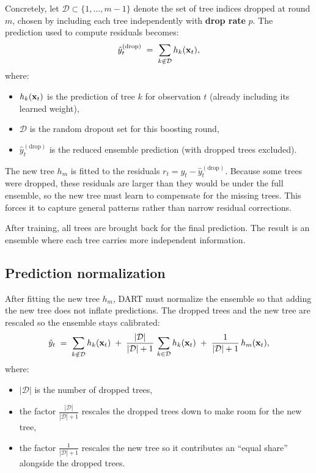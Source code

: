 Concretely, let $\mathcal{D} \subset \{1, \ldots, m-1\}$ denote the set of
tree indices dropped at round $m$, chosen by including each tree
independently with \textbf{drop rate} $p$.  The prediction used to compute
residuals becomes:
\begin{equation}\label{eq:trees:dart_pred}
  \hat{y}^{(\text{drop})}_t
  \;=\; \sum_{k \notin \mathcal{D}} h_k(\mathbf{x}_t),
\end{equation}
where:
\begin{itemize}[leftmargin=1.8em]
  \item $h_k(\mathbf{x}_t)$ is the prediction of tree $k$ for observation $t$
        (already including its learned weight),
  \item $\mathcal{D}$ is the random dropout set for this boosting round,
  \item $\hat{y}^{(\text{drop})}_t$ is the reduced ensemble prediction
        (with dropped trees excluded).
\end{itemize}

The new tree $h_m$ is fitted to the residuals
$r_t = y_t - \hat{y}^{(\text{drop})}_t$.  Because some trees were dropped,
these residuals are larger than they would be under the full ensemble, so the
new tree must learn to compensate for the missing trees.  This forces it to
capture general patterns rather than narrow residual corrections.

\begin{intuition}
After training, all trees are brought back for the final
prediction.  The result is an ensemble where each tree carries more
independent information.
\end{intuition}

\subsection*{Prediction normalization}

After fitting the new tree $h_m$, DART must normalize the ensemble so that
adding the new tree does not inflate predictions.  The dropped trees and the
new tree are rescaled so the ensemble stays calibrated:
\begin{equation}\label{eq:trees:dart_normalize}
  \hat{y}_t
  \;=\; \sum_{k \notin \mathcal{D}} h_k(\mathbf{x}_t)
  \;+\; \frac{|\mathcal{D}|}{|\mathcal{D}| + 1}\,
  \sum_{k \in \mathcal{D}} h_k(\mathbf{x}_t)
  \;+\; \frac{1}{|\mathcal{D}| + 1}\, h_m(\mathbf{x}_t),
\end{equation}
where:
\begin{itemize}[leftmargin=1.8em]
  \item $|\mathcal{D}|$ is the number of dropped trees,
  \item the factor $\frac{|\mathcal{D}|}{|\mathcal{D}|+1}$ rescales the
        dropped trees down to make room for the new tree,
  \item the factor $\frac{1}{|\mathcal{D}|+1}$ rescales the new tree so it
        contributes an ``equal share'' alongside the dropped trees.
\end{itemize}

